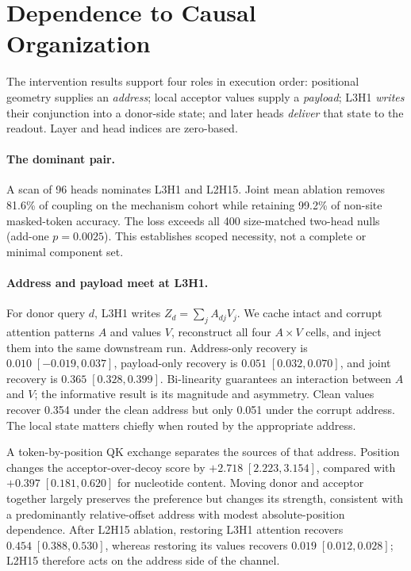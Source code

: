 \documentclass{article}
\begin{document}
\section{Dependence to Causal Organization}
\label{sec:core}

The intervention results support four roles in execution order: positional geometry supplies an
\emph{address}; local acceptor values supply a \emph{payload}; L3H1 \emph{writes} their conjunction into a donor-side state; and later heads \emph{deliver} that state to the readout. Layer and head indices are zero-based.

\paragraph{The dominant pair.}
A scan of 96 heads nominates L3H1 and L2H15. Joint mean ablation removes 81.6\% of coupling on the mechanism cohort while retaining 99.2\% of non-site masked-token accuracy. The loss exceeds all 400 size-matched two-head nulls (add-one \(p=0.0025\)). This establishes scoped necessity, not a complete or minimal component set.

\paragraph{Address and payload meet at L3H1.}
For donor query \(d\), L3H1 writes \(Z_d=\sum_j A_{dj}V_j\). We cache intact and corrupt attention patterns \(A\) and values \(V\), reconstruct all four \(A\times V\) cells, and inject them into the same downstream run. Address-only recovery is \(0.010\;[-0.019,0.037]\), payload-only recovery is \(0.051\;[0.032,0.070]\), and joint recovery is \(0.365\;[0.328,0.399]\). Bi-linearity guarantees an interaction between \(A\) and \(V\); the informative result is its magnitude and asymmetry. Clean values recover 0.354 under the clean address but only 0.051 under the corrupt address. The local state matters chiefly when routed by the appropriate address.

A token-by-position QK exchange separates the sources of that address. Position changes the acceptor-over-decoy score by \(+2.718\;[2.223,3.154]\), compared with \(+0.397\;[0.181,0.620]\) for nucleotide content. Moving donor and acceptor together largely preserves the preference but changes its strength, consistent with a predominantly relative-offset address with modest absolute-position dependence. After L2H15 ablation, restoring L3H1 attention recovers \(0.454\;[0.388,0.530]\), whereas restoring its values recovers \(0.019\;[0.012,0.028]\); L2H15 therefore acts on the address side of the channel.
\end{document}
